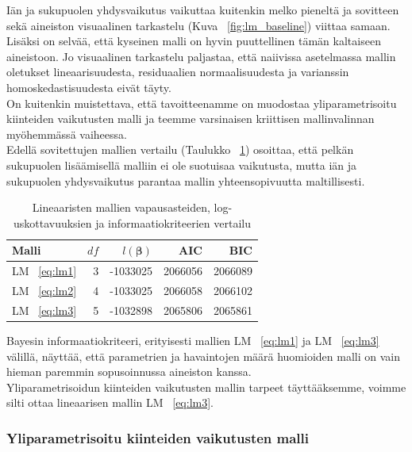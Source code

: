 \documentclass[finnish]{docopts}
\begin{document}
Iän ja sukupuolen yhdysvaikutus vaikuttaa kuitenkin melko pieneltä ja sovitteen sekä aineiston visuaalinen tarkastelu (Kuva ~\ref{fig:lm_baseline}) viittaa samaan. Lisäksi on selvää, että kyseinen malli on hyvin puuttellinen tämän kaltaiseen aineistoon. Jo visuaalinen tarkastelu paljastaa, että naiivissa asetelmassa mallin oletukset lineaarisuudesta, residuaalien normaalisuudesta ja varianssin homoskedastisuudesta eivät täyty.\\

On kuitenkin muistettava, että tavoitteenamme on muodostaa yliparametrisoitu kiinteiden vaikutusten malli ja teemme varsinaisen kriittisen mallinvalinnan myöhemmässä vaiheessa.\\

Edellä sovitettujen mallien vertailu (Taulukko ~\ref{table:lm_summary}) osoittaa, että pelkän sukupuolen lisäämisellä malliin ei ole suotuisaa vaikutusta, mutta iän ja sukupuolen yhdysvaikutus parantaa mallin yhteensopivuutta maltillisesti. 

\begin{table}[H]
\centering
\begin{tabular}{lrrrr}
\toprule
Malli & $df$ & $l(\bm{\beta})$ & AIC & BIC\\
\midrule
LM ~\ref{eq:lm1} & 3 & -1033025 & 2066056 & 2066089\\
LM ~\ref{eq:lm2} & 4 & -1033025 & 2066058 & 2066102\\
LM ~\ref{eq:lm3} & 5 & -1032898 & 2065806 & 2065861\\
\bottomrule
\end{tabular}
\caption{Lineaaristen mallien vapausasteiden, log-uskottavuuksien ja informaatiokriteerien vertailu}
\label{table:lm_summary}
\end{table}

Bayesin informaatiokriteeri, erityisesti mallien LM ~\ref{eq:lm1} ja LM ~\ref{eq:lm3} välillä, näyttää, että parametrien ja havaintojen määrä huomioiden malli on vain hieman paremmin sopusoinnussa aineiston kanssa.\\

Yliparametrisoidun kiinteiden vaikutusten mallin tarpeet täyttääksemme, voimme silti ottaa lineaarisen mallin LM ~\ref{eq:lm3}.\\

\subsubsection{Yliparametrisoitu kiinteiden vaikutusten malli}
\label{ssb:yliparammalli}
\end{document}
